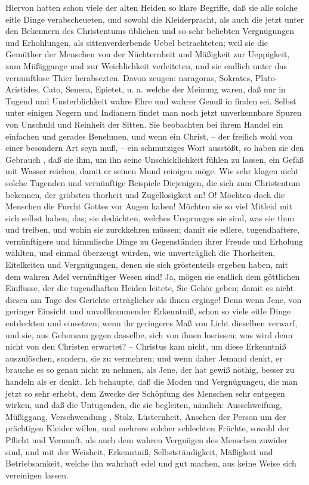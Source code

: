 Hiervon hatten schon viele der alten Heiden so klare Begriffe, daß sie alle solche eitle Dinge verabscheueten, und sowohl die Kleiderpracht, als auch die jetzt unter den Bekennern des Christentums üblichen und so sehr beliebten Vergnügungen und Erhohlungen, als sittenverderbende Uebel betrachteten; weil sie die Gemüther der Menschen von der Nüchternheit und Mäßigkeit zur Ueppigkeit, zum Müßiggange und zur Weichlichkeit verleiteten, und sie endlich unter das vernunftlose Thier herabsezten. Davon zeugen: naragoras, Sokrates, Plato- Aristides, Cato, Seneca, Epietet, u. a. welche der Meinung waren, daß nur in Tugend und Unsterblichkeit wahre Ehre und wahrer Genuß in finden sei. Selbst unter einigen Negern und Indianern findet man noch jetzt unverkennbare Spuren von Unschuld und Reinheit der Sitten. Sie beobachten bei ihrem Handel ein einfachen und gerades Benehmen, und wenn ein Christ, -- der freilich wohl von einer besondern Art seyn muß, -- ein schmutziges Wort ausstößt, so haben sie den Gebrauch , daß sie ihm, um ihn seine Unschicklichkeit fühlen zu lassen, ein Gefäß mit Wasser reichen, damit er seinen Mund reinigen möge. Wie sehr klagen nicht solche Tugenden und vernünftige Beispiele Diejenigen, die sich zum Christentum bekennen, der gröbsten thorheit und Zugellosigkeit an! O! Möchten doch die Menschen die Furcht Gottes vor Augen haben! Möchten sie so viel Mitleid mit sich selbst haben, das; sie dedächten, welches Ursprunges sie sind, was sie thun und treiben, und wohin sie zurckkehren müssen; damit sie edlere, tugendhaftere, vernünftigere und himmlische Dinge zu Gegenständen ihrer Freude und Erholung wählten, und einmal überzeugt würden, wie unverträglich die Thorheiten, Eitelkeiten und Vergnügungen, denen sie sich gröstenteils ergeben haben, mit dem wahren Adel vernünftiger Wesen sind! Ja, mögen sie endlich dem göttlichen Einflusse, der die tugendhaften Heiden leitete, Sie Gehör geben; damit es nicht diesen am Tage des Gerichte erträglicher als ihnen erginge! Denn wenn Jene, von geringer Einsicht und unvollkommender Erkenntniß, schon so viele eitle Dinge entdeckten und einsetzen; wenn ihr geringeres Maß von Licht dieselben verwarf, und sie, aus Gehorsam gegen dasselbe, sich von ihnen losrissen; was wird denn nicht von den Christen erwartet? -- Christus kam nicht, um diese Erkenntniß auszulöschen, sondern, sie zu vermehren; und wenn daher Jemand denkt, er brauche es so genau nicht zu nehmen, als Jene, der hat gewiß nöthig, besser zu handeln als er denkt. Ich behaupte, daß die Moden und Vergnügungeu, die man jetzt so sehr erhebt, dem Zwecke der Schöpfung des Menschen sehr entgegen wirken, und daß die Untugenden, die sie begleiten, nämlich: Ausschweifung, Müßiggang, Verschwendung , Stolz, Lüsternheit, Ansehen der Person um der prächtigen Kleider willen, und mehrere solcher schlechten Früchte, sowohl der Pflicht und Vernunft, als auch dem wahren Vergnügen des Menschen zuwider sind, und mit der Weisheit, Erkenntniß, Selbstständigkeit, Mäßigkeit und Betriebsamkeit, welche ihn wahrhaft edel und gut machen, aus keine Weise sich vereinigen lassen.

